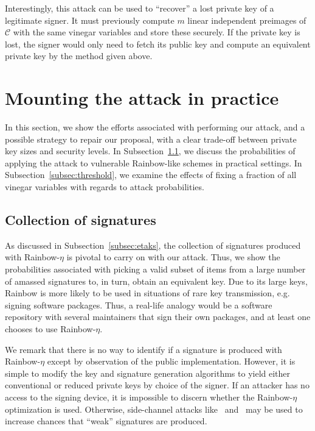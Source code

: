 \documentclass[12pt, a4paper, oneside]{memoir}
\theoremstyle{definition}
\begin{document}
Interestingly, this attack can be used to ``recover'' a lost private key of a legitimate signer. It must previously compute $m$ linear independent preimages of $\mathcal{C}$ with the same vinegar variables and store these securely. If the private key is lost, the signer would only need to fetch its public key and compute an equivalent private key by the method given above.

\section{Mounting the attack in practice}\label{sec:mount}

In this section, we show the efforts associated with performing our attack, and a possible strategy to repair our proposal, with a clear trade-off between private key sizes and security levels. In Subsection~\ref{subsec:collection}, we discuss the probabilities of applying the attack to vulnerable Rainbow-like schemes in practical settings. In Subsection~\ref{subsec:threshold}, we examine the effects of fixing a fraction of all vinegar variables with regards to attack probabilities.

\subsection{Collection of signatures}\label{subsec:collection}

As discussed in Subsection~\ref{subsec:etaks}, the collection of signatures produced with Rainbow-$\eta$ is pivotal to carry on with our attack. Thus, we show the probabilities associated with picking a valid subset of items from a large number of amassed signatures to, in turn, obtain an equivalent key. Due to its large keys, Rainbow is more likely to be used in situations of rare key transmission, e.g. signing software packages. Thus, a real-life analogy would be a software repository with several maintainers that sign their own packages, and at least one chooses to use Rainbow-$\eta$.

We remark that there is no way to identify if a signature is produced with Rainbow-$\eta$ except by observation of the public implementation. However, it is simple to modify the key and signature generation algorithms to yield either conventional or reduced private keys by choice of the signer. If an attacker has no access to the signing device, it is impossible to discern whether the Rainbow-$\eta$ optimization is used. Otherwise, side-channel attacks like~\cite{Kramer:201903} and~\cite{Shim:201512} may be used to increase chances that ``weak'' signatures are produced.
\end{document}
